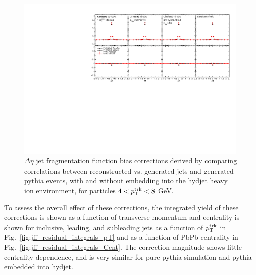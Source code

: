                       \begin{figure}[hbtp]
          \begin{center}\includegraphics[width=0.99\textwidth]{figures/JFF_SpillOver/JFF_Residual_Corrections_Eta_Inclusive_TrkPt4_TrkPt8.pdf}
          \caption[Jet fragmentation function bias corrections for particles with $4<p_{\rm T}^{\rm trk}<8$ GeV]{$\Delta\eta$ jet fragmentation function bias corrections derived by comparing correlations between reconstructed vs. generated jets and generated {\sc pythia} events, with and without embedding into the {\sc hydjet} heavy ion environment, for particles $4<p_{\rm T}^{\rm trk}<8$ GeV.}
            \label{fig:jff_residual_inclusive_trkpt4_trkpt8}
            \end{center}
            \end{figure}
            
           \clearpage  
           
To assess the overall effect of these corrections, the integrated yield of these corrections is shown as a function of transverse momentum and centrality is shown for inclusive, leading, and subleading jets as a function of $p_{\rm T}^{\rm trk}$ in Fig.~\ref{fig:jff_residual_integrals_pT} and as a function of PbPb centrality in Fig.~\ref{fig:jff_residual_integrals_Cent}.  The correction magnitude shows little centrality dependence, and is very similar for pure {\sc pythia} simulation and {\sc pythia} embedded into {\sc hydjet}.  
            
